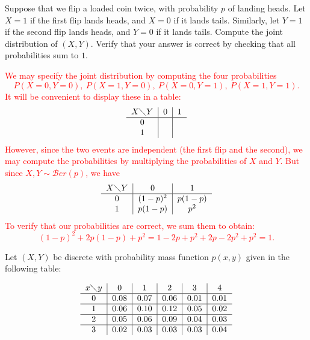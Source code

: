 \documentclass[12pt,reqno]{amsart}
\begin{document}
\bigskip

\prob Suppose that we flip a loaded coin twice, with probability $p$ of landing heads. Let $X=1$ if the first flip lands heads, and $X=0$ if it lands tails. Similarly, let $Y=1$ if the second flip lands heads, and $Y=0$ if it lands tails. Compute the joint distribution of $(X,Y)$. Verify that your answer is correct by checking that all probabilities sum to $1$.

\bigskip
\textcolor{red}{We may specify the joint distribution by computing the four probabilities
	\[
	P(X=0, Y=0),\ P(X=1, Y=0),\ P(X=0, Y=1), \ P(X=1, Y=1).
	\]
It will be convenient to display these in a table:
	\[
	\begin{tabular}{c|c|c}
	$X \diagdown Y$ & 0 & 1  \\ \hline
	0 & \\
	1 & 
	\end{tabular}
	\]
However, since the two events are independent (the first flip and the second), we may compute the probabilities by multiplying the probabilities of $X$ and $Y$. But since $X,Y\sim \mathcal{B}er(p)$, we have
	\[
	\begin{tabular}{c|c|c}
	$X \diagdown Y$ & 0 & 1  \\ \hline
	0 & $(1-p)^2$ & $p(1-p)$ \\
	1 & $p(1-p)$ & $p^2$
	\end{tabular}
	\]
To verify that our probabilities are correct, we sum them to obtain:
	\[
	(1-p)^2 + 2p(1-p) + p^2 = 1 - 2p + p^2 + 2p - 2p^2 + p^2 = 1.
	\]}
\bigskip











    
\prob Let $(X,Y)$ be discrete with probability mass function $p(x,y)$ given in the following table:


	\[
	\begin{tabular}{c|c|c|c|c|c}
	$x \diagdown y$ & 0 & 1 & 2 & 3 & 4  \\ \hline
	0 & 0.08 & 0.07 & 0.06 & 0.01 & 0.01 \\ \hline
	1 & 0.06 & 0.10 & 0.12 & 0.05 & 0.02 \\ \hline
	2 & 0.05 & 0.06 & 0.09 & 0.04 & 0.03 \\ \hline
	3 & 0.02 & 0.03 & 0.03 & 0.03 & 0.04 
	\end{tabular}
	\]
\end{document}
